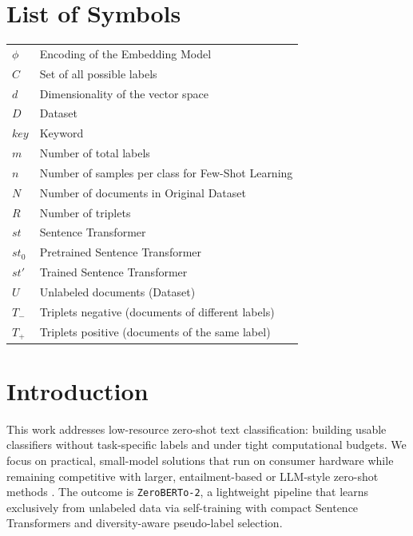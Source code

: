 \documentclass[]{politex-xico}
\begin{document}
\chapter*{{List of Symbols}}


\begin{table}[h]
\begin{tabular}{  l  l } 
$\phi$   & Encoding of the Embedding Model\\
$C$  &  Set of all possible labels\\
$d$ & Dimensionality of the vector space\\
$D$ & Dataset\\
$key$   &  Keyword\\
$m$  &  Number of total labels\\
$n$  &  Number of samples per class for Few-Shot Learning \\
$N$ & Number of documents in Original Dataset\\
$R$  &  Number of triplets\\
$st$ & Sentence Transformer\\
$st_0$  &  Pretrained Sentence Transformer\\
$st'$  &  Trained Sentence Transformer\\
$U$ & Unlabeled documents (Dataset)\\
$T_{-}$  &  Triplets negative (documents of different labels)\\
$T_{+}$  &  Triplets positive (documents of the same label)\\
\end{tabular}
\end{table}

\sumario


\chapter{Introduction}
\label{chapter:Introduction}

This work addresses low-resource zero-shot text classification: building usable classifiers without task-specific labels and under tight computational budgets. We focus on practical, small-model solutions that run on consumer hardware while remaining competitive with larger, entailment-based \cite{pamies2023weakly} or LLM-style zero-shot methods \cite{kojima2022large}. The outcome is \texttt{ZeroBERTo-2}, a lightweight pipeline that learns exclusively from unlabeled data via self-training with compact Sentence Transformers \cite{reimers2019sentence} and diversity-aware pseudo-label selection.
\end{document}
